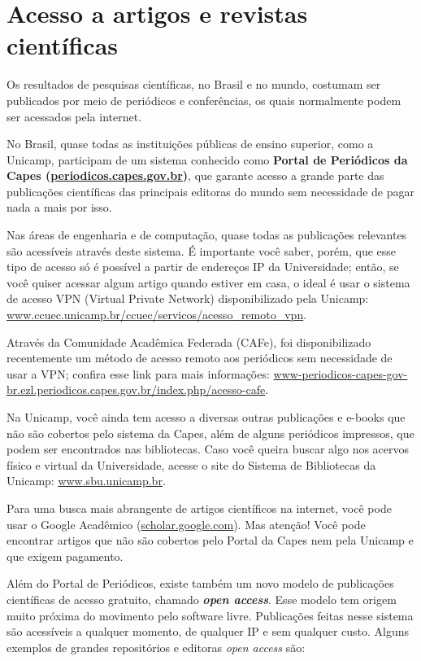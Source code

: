 \section{Acesso a artigos e revistas científicas}

Os resultados de pesquisas científicas, no Brasil e no mundo, costumam ser  publicados por meio de periódicos e conferências, os quais normalmente podem ser acessados pela internet.

No Brasil, quase todas as instituições públicas de ensino superior, como a Unicamp,  participam de um sistema conhecido como \textbf{Portal de Periódicos da Capes (\url{periodicos.capes.gov.br})}, que garante acesso a grande parte das publicações científicas  das principais editoras do mundo sem necessidade de pagar nada a mais por isso. 

Nas áreas de engenharia e de computação, quase todas as publicações relevantes são  acessíveis através deste sistema. É importante você saber, porém, que esse tipo de  acesso só é possível a partir de endereços IP da Universidade; então, se você quiser  acessar algum artigo quando estiver em casa, o ideal é usar o sistema de acesso VPN  (Virtual Private Network) disponibilizado pela Unicamp: \url{www.ccuec.unicamp.br/ccuec/servicos/acesso_remoto_vpn}. 

Através da Comunidade Acadêmica Federada (CAFe), foi disponibilizado recentemente um método de acesso remoto aos periódicos sem necessidade de usar a VPN; confira  esse link para mais informações:
\url{www-periodicos-capes-gov-br.ezl.periodicos.capes.gov.br/index.php/acesso-cafe}.

Na Unicamp, você ainda tem acesso a diversas outras publicações e e-books que não  são cobertos pelo sistema da Capes, além de alguns periódicos impressos, que podem  ser encontrados nas bibliotecas. Caso você queira buscar algo nos acervos físico e virtual  da Universidade, acesse o site do Sistema de Bibliotecas da Unicamp: \url{www.sbu.unicamp.br}.

Para uma busca mais abrangente de artigos científicos na internet, você pode usar o  Google Acadêmico (\url{scholar.google.com}). Mas atenção! Você pode encontrar artigos que  não são cobertos pelo Portal da Capes nem pela Unicamp e que exigem pagamento.

Além do Portal de Periódicos, existe também um novo modelo de publicações  científicas de acesso gratuito, chamado \textbf{\textit{open access}}. Esse modelo tem origem muito  próxima do movimento pelo software livre. Publicações feitas nesse sistema são  acessíveis a qualquer momento, de qualquer IP e sem qualquer custo. Alguns exemplos  de grandes repositórios e editoras \textit{open access} são:

